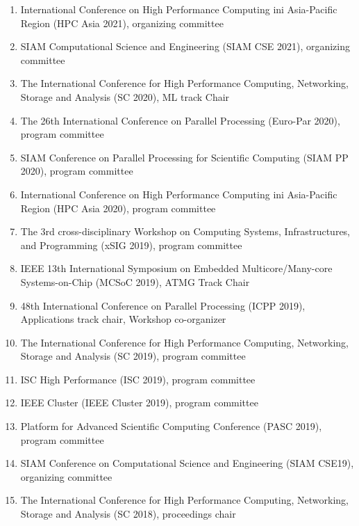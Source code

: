 \documentclass[margin,line]{cv}
\begin{document}
\begin{resume}
\begin{enumerate}
\item International Conference on High Performance Computing ini Asia-Pacific Region (HPC Asia 2021), organizing committee

\item SIAM Computational Science and Engineering (SIAM CSE 2021), organizing committee

\item The International Conference for High Performance Computing, Networking, Storage and Analysis (SC 2020), ML track Chair

\item The 26th International Conference on Parallel Processing (Euro-Par 2020), program committee

\item SIAM Conference on Parallel Processing for Scientific Computing (SIAM PP 2020), program committee

\item International Conference on High Performance Computing ini Asia-Pacific Region (HPC Asia 2020), program committee

\item The 3rd cross-disciplinary Workshop on Computing Systems, Infrastructures, and Programming (xSIG 2019), program committee

\item IEEE 13th International Symposium on Embedded Multicore/Many-core Systems-on-Chip (MCSoC 2019), ATMG Track Chair

\item 48th International Conference on Parallel Processing (ICPP 2019), Applications track chair, Workshop co-organizer

\item The International Conference for High Performance Computing, Networking, Storage and Analysis (SC 2019), program committee

\item ISC High Performance (ISC 2019), program committee

\item IEEE Cluster (IEEE Cluster 2019), program committee

\item Platform for Advanced Scientific Computing Conference (PASC 2019), program committee

\item SIAM Conference on Computational Science and Engineering (SIAM CSE19), organizing committee

\item The International Conference for High Performance Computing, Networking, Storage and Analysis (SC 2018), proceedings chair


\end{enumerate}
\end{resume}
\end{document}
